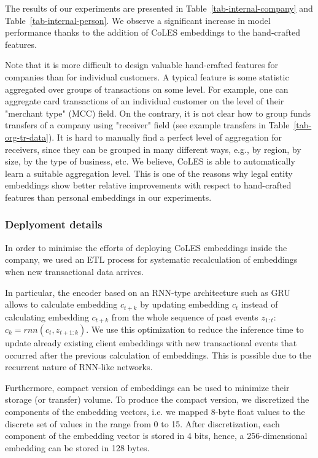 \documentclass[sigconf, anonymous]{acmart}
\begin{document}
The results of our experiments are presented in Table~\ref{tab-internal-company} and Table~\ref{tab-internal-person}. We observe a significant increase in model performance thanks to the addition of CoLES embeddings to the hand-crafted features.

Note that it is more difficult to design valuable hand-crafted features for companies than for individual customers. A typical feature is some statistic aggregated over groups of transactions on some level. For example, one can aggregate card transactions of an individual customer on the level of their "merchant type" (MCC) field. On the contrary, it is not clear how to group funds transfers of a company using "receiver" field (see example transfers in Table~\ref{tab-org-tr-data}). It is hard to manually find a perfect level of aggregation for receivers, since they can be grouped in many different ways, e.g., by region, by size, by the type of business, etc. We believe, CoLES is able to automatically learn a suitable aggregation level. This is one of the reasons why legal entity embeddings show better relative improvements with respect to hand-crafted features than personal embeddings in our experiments.

\subsubsection{Deplyoment details} \label{sec-deployment}

In order to minimise the efforts of deploying CoLES embeddings inside the company, we used an ETL process for systematic recalculation of embeddings when new transactional data arrives.

In particular, the encoder based on an RNN-type architecture such as GRU~\citep{Cho2014LearningPR} allows to calculate embedding $c_{t+k}$ by updating embedding $c_t$ instead of  calculating embedding $c_{t+k}$ from the whole sequence of past events $z_{1:t}$: $c_k = rnn(c_t, z_{t+1:k})$. We use this optimization to reduce the inference time to update already existing client embeddings with new transactional events that occurred after the previous calculation of embeddings. This is possible due to the recurrent nature of RNN-like networks.

Furthermore, compact version of embeddings can be used to minimize their storage (or transfer) volume. To produce the compact version, we discretized the components of the embedding vectors, i.e. we mapped 8-byte float values to the discrete set of values in the range from 0 to 15. After discretization, each component of the embedding vector is stored in 4 bits, hence, a 256-dimensional embedding can be stored in 128 bytes.
\end{document}
